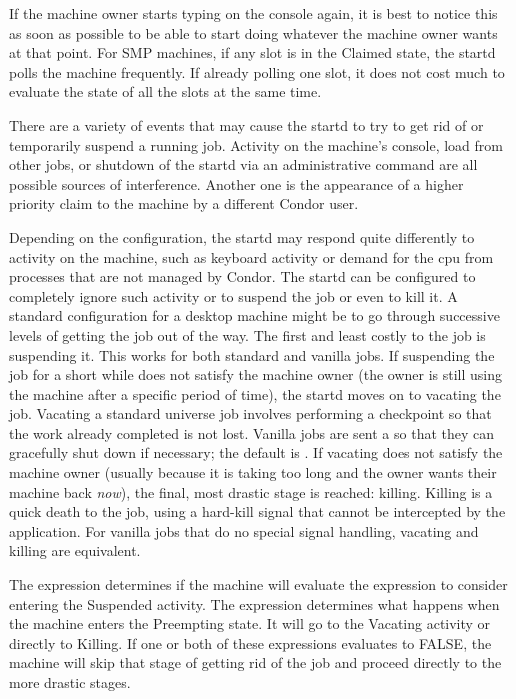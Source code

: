 If the machine owner starts typing on the console again,
it is best to notice this as
soon as possible to be able to start doing whatever 
the machine owner wants at that point.
For SMP machines, if any slot is in the Claimed state, the
startd polls the machine frequently.
If already polling one slot, it does not
cost much to evaluate the state of all the slots at
the same time.

There are a variety of events that may cause the startd to try to get
rid of or temporarily suspend a running job.  Activity on the
machine's console, load from other jobs, or shutdown of the startd via
an administrative command are all possible sources of interference.
Another one is the appearance of a higher priority claim to the
machine by a different Condor user.

Depending on the configuration, the startd may respond quite
differently to activity on the machine, such as keyboard activity or
demand for the cpu from processes that are not managed by Condor.  The
startd can be configured to completely ignore such activity or to
suspend the job or even to kill it.  A standard configuration for a desktop
machine might be to go through
successive levels of getting the job out of the way.
The first and least costly to the job is suspending it.
This works for both standard and vanilla jobs.
If suspending the job for a short while does not satisfy the machine
owner (the owner is still using the machine after a specific period of
time), the startd moves on to vacating the job.
Vacating a standard universe job
involves performing a checkpoint so that the work already completed
is not lost.  Vanilla jobs are sent a  so that they
can gracefully shut down if necessary; the default is \verb@SIGTERM@.
If vacating does not satisfy the machine owner (usually because it is
taking too long and the owner wants their machine back \emph{now}),
the final, most drastic stage is reached: killing.  
Killing is a quick death to the job, using a hard-kill signal that cannot
be intercepted by the application.  For vanilla jobs that do no special
signal handling, vacating and killing are equivalent.

The  expression determines if the machine will
evaluate the  expression to consider entering the
Suspended activity.
The  expression determines what happens when the
machine enters the Preempting state.
It will go to the Vacating
activity or directly to Killing. 
If one or both of these expressions evaluates to FALSE, the machine
will skip that stage of getting rid of the job and proceed directly to
the more drastic stages.

